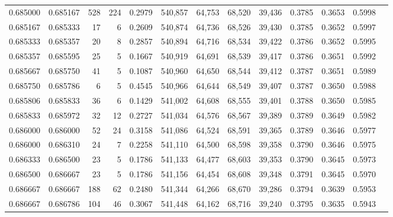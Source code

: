 \begin{tabular}{rrrrrrrrrrrrr}
0.685000 & 0.685167 &   528 & 224 &                                     0.2979 & 540,857 &  64,753 &  68,520 &  39,436 & 0.3785 & 0.3653 & 0.5998 \\
0.685167 & 0.685333 &    17 &   6 &                                     0.2609 & 540,874 &  64,736 &  68,526 &  39,430 & 0.3785 & 0.3652 & 0.5997 \\
0.685333 & 0.685357 &    20 &   8 &                                     0.2857 & 540,894 &  64,716 &  68,534 &  39,422 & 0.3786 & 0.3652 & 0.5995 \\
0.685357 & 0.685595 &    25 &   5 &                                     0.1667 & 540,919 &  64,691 &  68,539 &  39,417 & 0.3786 & 0.3651 & 0.5992 \\
0.685667 & 0.685750 &    41 &   5 &                                     0.1087 & 540,960 &  64,650 &  68,544 &  39,412 & 0.3787 & 0.3651 & 0.5989 \\
0.685750 & 0.685786 &     6 &   5 &                                     0.4545 & 540,966 &  64,644 &  68,549 &  39,407 & 0.3787 & 0.3650 & 0.5988 \\
0.685806 & 0.685833 &    36 &   6 &                                     0.1429 & 541,002 &  64,608 &  68,555 &  39,401 & 0.3788 & 0.3650 & 0.5985 \\
0.685833 & 0.685972 &    32 &  12 &                                     0.2727 & 541,034 &  64,576 &  68,567 &  39,389 & 0.3789 & 0.3649 & 0.5982 \\
0.686000 & 0.686000 &    52 &  24 &                                     0.3158 & 541,086 &  64,524 &  68,591 &  39,365 & 0.3789 & 0.3646 & 0.5977 \\
0.686000 & 0.686310 &    24 &   7 &                                     0.2258 & 541,110 &  64,500 &  68,598 &  39,358 & 0.3790 & 0.3646 & 0.5975 \\
0.686333 & 0.686500 &    23 &   5 &                                     0.1786 & 541,133 &  64,477 &  68,603 &  39,353 & 0.3790 & 0.3645 & 0.5973 \\
0.686500 & 0.686667 &    23 &   5 &                                     0.1786 & 541,156 &  64,454 &  68,608 &  39,348 & 0.3791 & 0.3645 & 0.5970 \\
0.686667 & 0.686667 &   188 &  62 &                                     0.2480 & 541,344 &  64,266 &  68,670 &  39,286 & 0.3794 & 0.3639 & 0.5953 \\
0.686667 & 0.686786 &   104 &  46 &                                     0.3067 & 541,448 &  64,162 &  68,716 &  39,240 & 0.3795 & 0.3635 & 0.5943 \\

\end{tabular}
